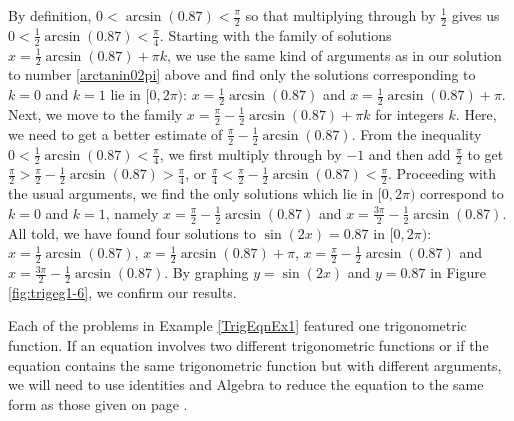 {\begin{enumerate}
By definition, $0 < \arcsin(0.87) < \frac{\pi}{2}$ so that multiplying through by $\frac{1}{2}$ gives us $0 < \frac{1}{2} \arcsin(0.87) < \frac{\pi}{4}$.  Starting with the family of solutions $x = \frac{1}{2} \arcsin(0.87) + \pi k$, we use the same kind of arguments as in our solution to number \ref{arctanin02pi} above and find only the solutions corresponding to $k =0$ and $k=1$ lie in $[0,2\pi)$:  $x = \frac{1}{2} \arcsin(0.87)$ and $x = \frac{1}{2} \arcsin(0.87) + \pi$.  Next, we move to the family $x =\frac{\pi}{2} -  \frac{1}{2}\arcsin(0.87) + \pi k$ for integers $k$. Here, we need to get a better estimate of $\frac{\pi}{2} - \frac{1}{2} \arcsin(0.87)$.  From the inequality $0 < \frac{1}{2}\arcsin(0.87) < \frac{\pi}{4}$, we first multiply through by $-1$ and then add $\frac{\pi}{2}$ to get $\frac{\pi}{2} > \frac{\pi}{2} -\frac{1}{2} \arcsin(0.87) >  \frac{\pi}{4}$, or $\frac{\pi}{4} < \frac{\pi}{2} -\frac{1}{2} \arcsin(0.87) < \frac{\pi}{2}$.  Proceeding with the usual arguments, we find the only solutions which lie in $[0,2\pi)$ correspond to $k = 0$ and $k=1$, namely $x =\frac{\pi}{2} -  \frac{1}{2}\arcsin(0.87)$ and  $x = \frac{3\pi}{2} - \frac{1}{2}\arcsin(0.87)$. All told, we have found four solutions to $\sin(2x) = 0.87$ in $[0,2\pi)$:  $x =\frac{1}{2} \arcsin(0.87)$, $x=\frac{1}{2} \arcsin(0.87) + \pi$, $x =\frac{\pi}{2} -  \frac{1}{2}\arcsin(0.87)$ and  $x = \frac{3\pi}{2} - \frac{1}{2}\arcsin(0.87)$. By graphing $y = \sin(2x)$ and $y = 0.87$ in Figure \ref{fig:trigeg1-6}, we confirm our results.


\end{enumerate}
}

\medskip

Each of the problems in Example \ref{TrigEqnEx1} featured one trigonometric function.  If an equation involves two different trigonometric functions or if the equation contains the same trigonometric function but with different arguments, we will need to use identities and Algebra to reduce the equation to the same form as those given on page  \pageref{trigeqnstrategy1}.

\medskip
 
